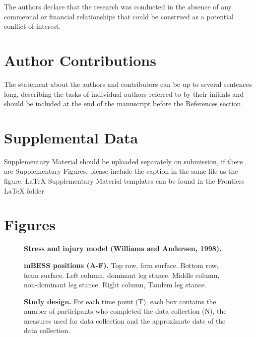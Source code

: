 \documentclass[
  english,
  man]{apa6}
\begin{document}
The authors declare that the research was conducted in the absence of any
commercial or financial relationships that could be construed as a potential
conflict of interest.

\hypertarget{author-contributions}{%
\section{Author Contributions}\label{author-contributions}}

The statement about the authors and contributors can be up to several sentences
long, describing the tasks of individual authors referred to by their initials
and should be included at the end of the manuscript before the References
section.

\hypertarget{supplemental-data}{%
\section{Supplemental Data}\label{supplemental-data}}

Supplementary Material should be uploaded separately on submission, if there are
Supplementary Figures, please include the caption in the same file as the
figure. LaTeX Supplementary Material templates can be found in the Frontiers
LaTeX folder

\hypertarget{figures}{%
\section{Figures}\label{figures}}

\begin{figure}[!h]
\caption{{\bf Stress and injury model (Williams and Andersen, 1998).}}
\label{fig:fig1}
\end{figure}

\begin{figure}[!h]
\caption{{\bf mBESS positions (A-F).}
Top row, firm surface. Bottom row, foam surface. Left column, dominant leg stance. Middle column, non-dominant leg stance. Right column, Tandem leg stance.}
\label{fig:fig2}
\end{figure}

\begin{figure}[!h]
\caption{{\bf Study design.}
For each time point (T), each box contains the number of participants who completed the data collection (N), the measures used for data collection and the approximate date of the data collection.}
\label{fig:fig3}
\end{figure}
\end{document}
